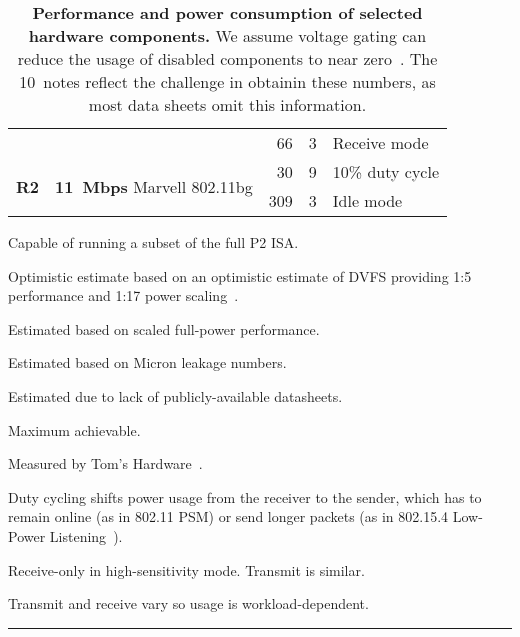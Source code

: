 \begin{table}[t]
\begin{threeparttable}
{\begin{tabularx}{\columnwidth}{p{0.05in}lr@{.}lX}
& &
66 & 3\tnote{9} &
Receive mode\tnote{9}
\\ \cmidrule(lr){2-5}

\multirow{2}{*}{\textbf{R2}} & \multirow{2}{*}{\textbf{11~Mbps} Marvell 802.11bg} &
30 & 9\tnote{3} &
10\% duty cycle\tnote{8}
\\

& &
309 & 3\tnote{10} &
Idle mode\tnote{10}
\\

\end{tabularx}
}
{\footnotesize
\begin{tablenotes}
\item [1] Capable of running a subset of the full P2 ISA.
\item [2] Optimistic estimate based on an optimistic estimate of DVFS providing 1:5 performance and
1:17 power scaling~\cite{jssc02-PowerPC-SoC}.
\item [3] Estimated based on scaled full-power performance.
\item [4] Estimated based on Micron leakage numbers.
\item [5] Estimated due to lack of publicly-available datasheets.
\item [6] Maximum achievable.
\item [7] Measured by Tom's Hardware~\cite{ssd-tomshardware}.
\item [8] Duty cycling shifts power usage from the receiver to the sender,
which has to remain online (as in 802.11 PSM) or send longer packets (as in
802.15.4 Low-Power Listening~\cite{tinyos-lpl}).
\item [9] Receive-only in high-sensitivity mode. Transmit is similar.
\item [10] Transmit and receive vary so usage is workload-dependent.
\end{tablenotes}
}
\vspace*{-0.05in}
\caption{\textbf{Performance and power consumption of selected hardware
components.} We assume voltage gating can reduce the usage of disabled
components to near zero~\cite{islped-vdd-gate}. The 10~notes reflect the
challenge in obtainin these numbers, as most data sheets omit this
information.}
\end{threeparttable}
\label{table-components}
\vspace{0.10in}
\hrule
\vspace{-0.20in}
\end{table}
